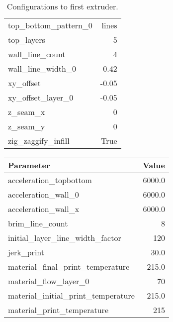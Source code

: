 \begin{multicols}{2}
\begin{table}[H]
\begin{tabular}{ |l|r| }
            top\_bottom\_pattern\_0               & lines          \\
            top\_layers                           & 5              \\
            wall\_line\_count                     & 4              \\
            wall\_line\_width\_0                  & 0.42           \\
            xy\_offset                            & -0.05          \\
            xy\_offset\_layer\_0                  & -0.05          \\
            z\_seam\_x                            & 0              \\
            z\_seam\_y                            & 0              \\
            zig\_zaggify\_infill                  & True           \\
            \hline
        \end{tabular}
        \caption{Configurations to first extruder.}
    \end{table}
    \columnbreak
    \begin{table}[H]
        \scriptsize
        \centering
        \begin{tabular}{|l|r|}
            \hline
            \textbf{Parameter}                    & \textbf{Value} \\
            \hline
            acceleration\_topbottom               & 6000.0         \\
            acceleration\_wall\_0                 & 6000.0         \\
            acceleration\_wall\_x                 & 6000.0         \\
            brim\_line\_count                     & 8              \\
            initial\_layer\_line\_width\_factor   & 120            \\
            jerk\_print                           & 30.0           \\
            material\_final\_print\_temperature   & 215.0          \\
            material\_flow\_layer\_0              & 70             \\
            material\_initial\_print\_temperature & 215.0          \\
            material\_print\_temperature          & 215            \\

\end{tabular}
\end{table}
\end{multicols}
